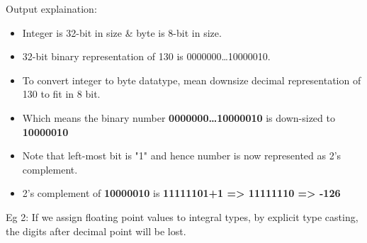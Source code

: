 \begin{flushleft}
\begin{itemize}
		Output explaination:
		\begin{itemize}
			\item Integer is 32-bit in size \& byte is 8-bit in size.
			\item 32-bit binary representation of 130 is 0000000…10000010.
			\item To convert integer to byte datatype, mean downsize decimal representation of 130 to fit in 8 bit.
			\item Which means the binary number \textbf{0000000…10000010} is down-sized to \textbf{10000010}
			\item Note that left-most bit is "1" and hence number is now represented as 2's complement.
			\item 2's complement of \textbf{10000010} is \textbf{11111101+1 => 11111110 => -126}
		\end{itemize}

		\bigskip

		Eg 2: If we assign floating point values to integral types, by explicit type casting, the digits after decimal point will be lost.
		\bigskip
		
	\end{itemize}
	
\end{flushleft}


\newpage


